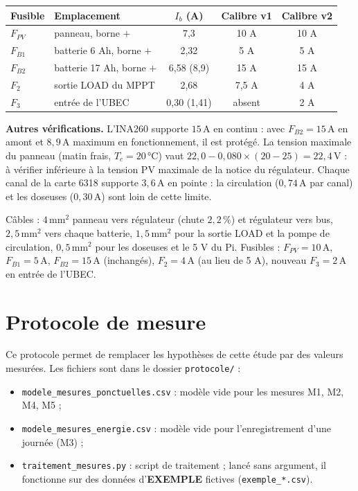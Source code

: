 \documentclass[11pt,a4paper]{article}
\newcommand{\U}[1]{\,\mathrm{#1}}
\begin{document}
\begin{center}
\begin{tabular}{l l c c c}
\toprule
\textbf{Fusible} & \textbf{Emplacement} & \textbf{$I_b$ (A)} & \textbf{Calibre v1} & \textbf{Calibre v2} \\
\midrule
$F_{PV}$ & panneau, borne $+$ & 7,3 & 10 A & 10 A \\
$F_{B1}$ & batterie 6 Ah, borne $+$ & 2,32 & 5 A & 5 A \\
$F_{B2}$ & batterie 17 Ah, borne $+$ & 6,58 (8,9) & 15 A & 15 A \\
$F_2$ & sortie LOAD du MPPT & 2,68 & 7,5 A & 4 A \\
$F_3$ & entrée de l'UBEC & 0,30 (1,41) & absent & 2 A \\
\bottomrule
\end{tabular}
\end{center}

\textbf{Autres vérifications.} L'INA260 supporte $15\U{A}$ en continu : avec $F_{B2} = 15\U{A}$ en amont et $8{,}9\U{A}$ maximum en fonctionnement, il est protégé. La tension maximale du panneau (matin frais, $T_c = 20\U{°C}$) vaut $22{,}0 - 0{,}080 \times (20 - 25) = 22{,}4\U{V}$ : à vérifier inférieure à la tension PV maximale de la notice du régulateur. Chaque canal de la carte 6318 supporte $3{,}6\U{A}$ en pointe : la circulation ($0{,}74\U{A}$ par canal) et les doseuses ($0{,}30\U{A}$) sont loin de cette limite.

\begin{resume}
Câbles : $4\U{mm^2}$ panneau vers régulateur (chute $2{,}2\U{\%}$) et régulateur vers bus, $2{,}5\U{mm^2}$ vers chaque batterie, $1{,}5\U{mm^2}$ pour la sortie LOAD et la pompe de circulation, $0{,}5\U{mm^2}$ pour les doseuses et le 5 V du Pi. Fusibles : $F_{PV} = 10\U{A}$, $F_{B1} = 5\U{A}$, $F_{B2} = 15\U{A}$ (inchangés), $F_2 = 4\U{A}$ (au lieu de 5 A), nouveau $F_3 = 2\U{A}$ en entrée de l'UBEC.
\end{resume}

\newpage
\section{Protocole de mesure}
\label{sec:protocole}

Ce protocole permet de remplacer les hypothèses de cette étude par des valeurs mesurées. Les fichiers sont dans le dossier \texttt{protocole/} :
\begin{itemize}[nosep]
\item \texttt{modele\_mesures\_ponctuelles.csv} : modèle vide pour les mesures M1, M2, M4, M5 ;
\item \texttt{modele\_mesures\_energie.csv} : modèle vide pour l'enregistrement d'une journée (M3) ;
\item \texttt{traitement\_mesures.py} : script de traitement ; lancé sans argument, il fonctionne sur des données d'\textbf{EXEMPLE} fictives (\texttt{exemple\_*.csv}).
\end{itemize}
\end{document}
